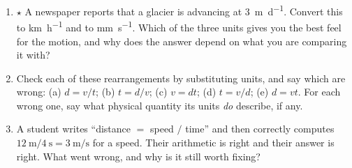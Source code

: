 \documentclass[11pt,twoside,openany]{book}
\begin{document}
\begin{enumerate}[label=\textbf{\thechapter.\arabic*},resume=exercises,leftmargin=*]
  \item $\star$ A newspaper reports that a glacier is advancing at \SI{3}{\metre\per\day}. Convert this to \si{\kilo\metre\per\hour} and to \si{\milli\metre\per\second}. Which of the three units gives you the best feel for the motion, and why does the answer depend on what you are comparing it with?
  \item Check each of these rearrangements by substituting units, and say which are wrong: (a) $d = v/t$; (b) $t = d/v$; (c) $v = dt$; (d) $t = v/d$; (e) $d = vt$. For each wrong one, say what physical quantity its units \emph{do} describe, if any.
  \item A student writes ``distance $=$ speed $/$ time'' and then correctly computes $\SI{12}{\metre}/\SI{4}{\second} = \SI{3}{\metre\per\second}$ for a speed. Their arithmetic is right and their answer is right. What went wrong, and why is it still worth fixing?
\end{enumerate}
\end{document}
